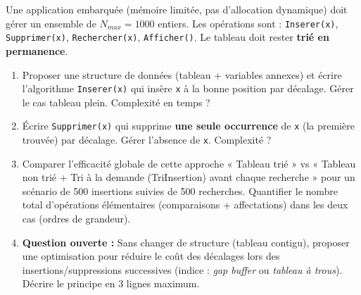 \documentclass[11pt]{article}
\begin{document}
\begin{exercice}
Une application embarquée (mémoire limitée, pas d'allocation dynamique) doit gérer un ensemble de $N_{max}=1000$ entiers. Les opérations sont : \texttt{Inserer(x)}, \texttt{Supprimer(x)}, \texttt{Rechercher(x)}, \texttt{Afficher()}. Le tableau doit rester \textbf{trié en permanence}.
\begin{enumerate}
    \item Proposer une structure de données (tableau + variables annexes) et écrire l'algorithme \texttt{Inserer(x)} qui insère \texttt{x} à la bonne position par décalage. Gérer le cas tableau plein. Complexité en temps ?
    \item Écrire \texttt{Supprimer(x)} qui supprime \textbf{une seule occurrence} de \texttt{x} (la première trouvée) par décalage. Gérer l'absence de \texttt{x}. Complexité ?
    \item Comparer l'efficacité globale de cette approche « Tableau trié » vs « Tableau non trié + Tri à la demande (TriInsertion) avant chaque recherche » pour un scénario de 500 insertions suivies de 500 recherches. Quantifier le nombre total d'opérations élémentaires (comparaisons + affectations) dans les deux cas (ordres de grandeur).
    \item \textbf{Question ouverte :} Sans changer de structure (tableau contigu), proposer une optimisation pour réduire le coût des décalages lors des insertions/suppressions successives (indice : \textit{gap buffer} ou \textit{tableau à trous}). Décrire le principe en 3 lignes maximum.
\end{enumerate}
\end{exercice}
\end{document}
